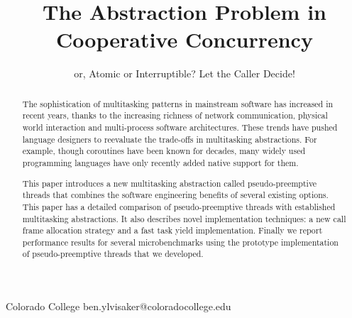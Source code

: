\documentclass[9pt,preprint]{sigplanconf}
\begin{document}
\newcommand{\charcoal}{Charcoal}
\newcommand{\atomic}{\texttt{atomic}}

\setlength{\pdfpageheight}{\paperheight}
\setlength{\pdfpagewidth}{\paperwidth}



\title{The Abstraction Problem in Cooperative Concurrency}
\subtitle{or, Atomic or Interruptible?
Let the Caller Decide!}

           {Colorado College}
           {ben.ylvisaker@coloradocollege.edu}

\maketitle

\begin{abstract}

The sophistication of multitasking patterns in mainstream software has increased in recent years, thanks to the increasing richness of network communication, physical world interaction and multi-process software architectures.
These trends have pushed language designers to reevaluate the trade-offs in multitasking abstractions.
For example, though coroutines have been known for decades, many widely used programming languages have only recently added native support for them.

This paper introduces a new multitasking abstraction called pseudo-preemptive threads that combines the software engineering benefits of several existing options.
This paper has a detailed comparison of pseudo-preemptive threads with established multitasking abstractions.
It also describes novel implementation techniques: a new call frame allocation strategy and a fast task yield implementation.
Finally we report performance results for several microbenchmarks using the prototype implementation of pseudo-preemptive threads that we developed.

\end{abstract}
\end{document}
